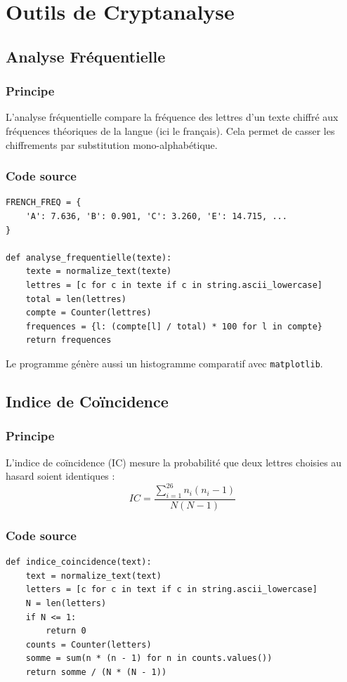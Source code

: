 \documentclass[12pt,a4paper]{report}
\begin{document}
\chapter{Outils de Cryptanalyse}

\section{Analyse Fréquentielle}

\subsection{Principe}
L'analyse fréquentielle compare la fréquence des lettres d'un texte chiffré aux fréquences théoriques de la langue (ici le français). Cela permet de casser les chiffrements par substitution mono-alphabétique.

\subsection{Code source}
\begin{lstlisting}[style=python,caption=AnalyseFrequentielle.py]
FRENCH_FREQ = {
    'A': 7.636, 'B': 0.901, 'C': 3.260, 'E': 14.715, ...
}

def analyse_frequentielle(texte):
    texte = normalize_text(texte)
    lettres = [c for c in texte if c in string.ascii_lowercase]
    total = len(lettres)
    compte = Counter(lettres)
    frequences = {l: (compte[l] / total) * 100 for l in compte}
    return frequences
\end{lstlisting}
Le programme génère aussi un histogramme comparatif avec \texttt{matplotlib}.

\section{Indice de Coïncidence}

\subsection{Principe}
L'indice de coïncidence (IC) mesure la probabilité que deux lettres choisies au hasard soient identiques :
$$IC = \frac{\sum_{i=1}^{26} n_i(n_i - 1)}{N(N-1)}$$

\subsection{Code source}
\begin{lstlisting}[style=python,caption=IndiceDeCoincidence.py]
def indice_coincidence(text):
    text = normalize_text(text)
    letters = [c for c in text if c in string.ascii_lowercase]
    N = len(letters)
    if N <= 1:
        return 0
    counts = Counter(letters)
    somme = sum(n * (n - 1) for n in counts.values())
    return somme / (N * (N - 1))
\end{lstlisting}
\end{document}

